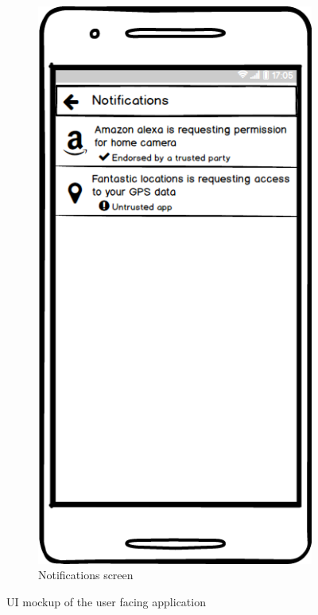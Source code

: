 \documentclass[conference]{IEEEtran}
\begin{document}
\begin{figure}[t]
\begin{subfigure}{0.24\textwidth}
	\includegraphics[width=0.95\linewidth]{screen4.png}
	\caption{Notifications screen}
	\label{fig:screen4}
	\end{subfigure}
\caption{UI mockup of the user facing application}\label{fig:screens}
\end{figure}
\end{document}
